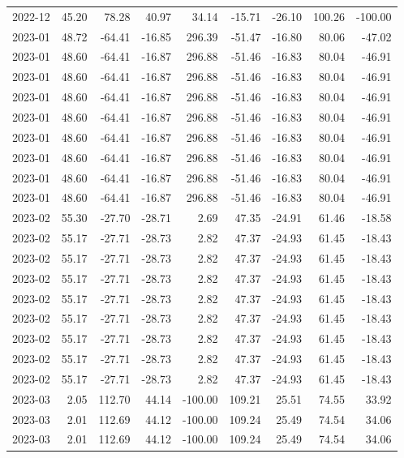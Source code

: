 \begin{table}[ht]
\begin{tabular}{lrrrrrrrr}
  2022-12 & 45.20 & 78.28 & 40.97 & 34.14 & -15.71 & -26.10 & 100.26 & -100.00 \\ 
  2023-01 & 48.72 & -64.41 & -16.85 & 296.39 & -51.47 & -16.80 & 80.06 & -47.02 \\ 
  2023-01 & 48.60 & -64.41 & -16.87 & 296.88 & -51.46 & -16.83 & 80.04 & -46.91 \\ 
  2023-01 & 48.60 & -64.41 & -16.87 & 296.88 & -51.46 & -16.83 & 80.04 & -46.91 \\ 
  2023-01 & 48.60 & -64.41 & -16.87 & 296.88 & -51.46 & -16.83 & 80.04 & -46.91 \\ 
  2023-01 & 48.60 & -64.41 & -16.87 & 296.88 & -51.46 & -16.83 & 80.04 & -46.91 \\ 
  2023-01 & 48.60 & -64.41 & -16.87 & 296.88 & -51.46 & -16.83 & 80.04 & -46.91 \\ 
  2023-01 & 48.60 & -64.41 & -16.87 & 296.88 & -51.46 & -16.83 & 80.04 & -46.91 \\ 
  2023-01 & 48.60 & -64.41 & -16.87 & 296.88 & -51.46 & -16.83 & 80.04 & -46.91 \\ 
  2023-01 & 48.60 & -64.41 & -16.87 & 296.88 & -51.46 & -16.83 & 80.04 & -46.91 \\ 
  2023-02 & 55.30 & -27.70 & -28.71 & 2.69 & 47.35 & -24.91 & 61.46 & -18.58 \\ 
  2023-02 & 55.17 & -27.71 & -28.73 & 2.82 & 47.37 & -24.93 & 61.45 & -18.43 \\ 
  2023-02 & 55.17 & -27.71 & -28.73 & 2.82 & 47.37 & -24.93 & 61.45 & -18.43 \\ 
  2023-02 & 55.17 & -27.71 & -28.73 & 2.82 & 47.37 & -24.93 & 61.45 & -18.43 \\ 
  2023-02 & 55.17 & -27.71 & -28.73 & 2.82 & 47.37 & -24.93 & 61.45 & -18.43 \\ 
  2023-02 & 55.17 & -27.71 & -28.73 & 2.82 & 47.37 & -24.93 & 61.45 & -18.43 \\ 
  2023-02 & 55.17 & -27.71 & -28.73 & 2.82 & 47.37 & -24.93 & 61.45 & -18.43 \\ 
  2023-02 & 55.17 & -27.71 & -28.73 & 2.82 & 47.37 & -24.93 & 61.45 & -18.43 \\ 
  2023-02 & 55.17 & -27.71 & -28.73 & 2.82 & 47.37 & -24.93 & 61.45 & -18.43 \\ 
  2023-03 & 2.05 & 112.70 & 44.14 & -100.00 & 109.21 & 25.51 & 74.55 & 33.92 \\ 
  2023-03 & 2.01 & 112.69 & 44.12 & -100.00 & 109.24 & 25.49 & 74.54 & 34.06 \\ 
  2023-03 & 2.01 & 112.69 & 44.12 & -100.00 & 109.24 & 25.49 & 74.54 & 34.06 \\ 

\end{tabular}
\end{table}
